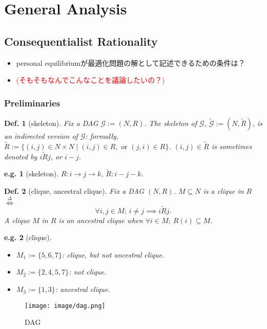 \documentclass[11pt,a4paper,dvipdfmx]{article}
\theoremstyle{plain}
\newtheorem{df}{Def.}[section]
\newtheorem{eg}{e.g.}[section]
\newcommand{\mG}{\mathcal{G}}
\renewcommand{\tilde}{\widetilde}
\newcommand{\defi}{\stackrel{\Delta}{\Longleftrightarrow}}
\newcommand{\ocomment}[1]{{\textcolor{red}{#1}}}
\begin{document}
\newpage
\section{General Analysis}
\subsection{Consequentialist Rationality}
\begin{itemize}
	\item personal equilibriumが最適化問題の解として記述できるための条件は？
	\item \ocomment{(そもそもなんでこんなことを議論したいの？)}
\end{itemize}

\subsubsection{Preliminaries}
\begin{df}[skeleton] Fix a DAG $\mG := (N,R)$.
	The skeleton of $\mG$, $\tilde{\mG} := (N, \tilde{R})$, is an indirected version of $\mG$: formally, $\tilde{R} := \{(i, j) \in N \times N \mid (i, j) \in R, \text{ or } (j, i) \in R\}$. $(i, j) \in \tilde{R}$ is sometimes denoted by $i \tilde{R} j$, or $i - j$.
\end{df}
\begin{eg}[skeleton]
	$R: i \to j \to k$, $\tilde{R}: i - j - k$.
\end{eg}

\begin{df}[clique, ancestral clique] Fix a DAG $(N, R)$.
	$M \subseteq N$ is a clique in $R$ \\
$\defi$
$$
\forall i,j \in M; \ i \neq j \implies i \tilde{R} j.
$$
A clique $M$ in $R$ is an ancestral clique when $\forall i \in M; \ R(i) \subseteq M$.
\end{df}

\begin{screen}
\begin{eg}[clique]
\begin{itemize}
	\item $M_1 := \{5,6,7\}$: clique, but not ancestral clique.
	\item $M_2 := \{2,4,5,7\}$: not clique.
	\item $M_3 := \{1,3\}$: ancestral clique.
\end{itemize}
\end{eg}
\begin{figure}[H]
  \centering
    \texttt{[image: image/dag.png]}
    \caption{DAG} \label{fig1}
\end{figure}
\end{screen}
\end{document}
